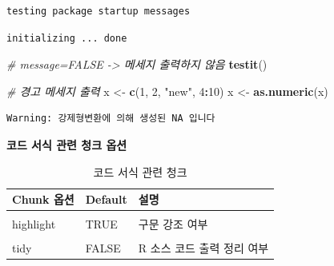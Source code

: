 \documentclass[
  11pt,
]{krantz}
\newenvironment{Shaded}{\begin{snugshade}}{\end{snugshade}}
\newcommand{\CommentTok}[1]{\textcolor[rgb]{0.37,0.37,0.37}{\textit{#1}}}
\newcommand{\DecValTok}[1]{\textcolor[rgb]{0.06,0.06,0.06}{#1}}
\newcommand{\KeywordTok}[1]{\textcolor[rgb]{0.27,0.27,0.27}{\textbf{#1}}}
\newcommand{\NormalTok}[1]{#1}
\newcommand{\OperatorTok}[1]{\textcolor[rgb]{0.43,0.43,0.43}{\textbf{#1}}}
\newcommand{\StringTok}[1]{\textcolor[rgb]{0.5,0.5,0.5}{#1}}
\begin{document}
\begin{verbatim}
testing package startup messages
\end{verbatim}

\begin{verbatim}
initializing ... done
\end{verbatim}

\normalsize

\footnotesize

\begin{Shaded}
\begin{Highlighting}[]
\CommentTok{# message=FALSE -> 메세지 출력하지 않음}
\KeywordTok{testit}\NormalTok{()}
\end{Highlighting}
\end{Shaded}

\normalsize

\footnotesize

\begin{Shaded}
\begin{Highlighting}[]
\CommentTok{# 경고 메세지 출력}
\NormalTok{x <-}\StringTok{ }\KeywordTok{c}\NormalTok{(}\DecValTok{1}\NormalTok{, }\DecValTok{2}\NormalTok{, }\StringTok{"new"}\NormalTok{, }\DecValTok{4}\OperatorTok{:}\DecValTok{10}\NormalTok{)}
\NormalTok{x <-}\StringTok{ }\KeywordTok{as.numeric}\NormalTok{(x)}
\end{Highlighting}
\end{Shaded}

\begin{verbatim}
Warning: 강제형변환에 의해 생성된 NA 입니다
\end{verbatim}

\normalsize

\textbf{코드 서식 관련 청크 옵션}

\footnotesize

\begin{table}[H]

\caption{\label{tab:chunk-tab-03}코드 서식 관련 청크}
\centering
\fontsize{11}{13}\selectfont
\begin{tabular}[t]{>{\raggedright\arraybackslash}p{3cm}>{\raggedright\arraybackslash}p{3cm}>{\raggedright\arraybackslash}p{8cm}}
\toprule
Chunk 옵션 & Default & 설명\\
\midrule
\cellcolor{gray!6}{comment} & \cellcolor{gray!6}{TRUE} & \cellcolor{gray!6}{소스 코드 실행 출력의 각 줄 앞에 붙는 표시문자 출력 여부: 기본 값은 '\#\#' 임}\\
highlight & TRUE & 구문 강조 여부\\
\cellcolor{gray!6}{prompt} & \cellcolor{gray!6}{FALSE} & \cellcolor{gray!6}{R 프롬프트 출력 여부}\\
tidy & FALSE & R 소스 코드 출력 정리 여부\\
\bottomrule
\end{tabular}
\end{table}
\end{document}
